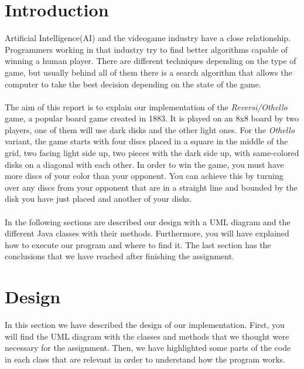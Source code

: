 \documentclass[12pt]{article}
\begin{document}
\section{Introduction}
Artificial Intelligence(AI) and the videogame industry have a close relationship. Programmers working in that industry try to find better algorithms capable of winning a human player. There are different techniques depending on the type of game, but usually behind all of them there is a search algorithm that allows the computer to take the best decision depending on the state of the game.\\
\\ 
The aim of this report is to explain our implementation of the \emph{Reversi/Othello} game, a popular board game created in 1883. It is played on an 8x8 board by two players, one of them will use dark disks and the other light ones. For the \emph{Othello} variant, the game starts with four discs placed in a square in the middle of the grid,  two facing light side up, two pieces with the dark side up, with same-colored disks on a diagonal with each other. In order to win the game, you must have more discs of your color than your opponent. You can achieve this by turning over any discs from your opponent that are in a straight line and bounded by the disk you have just placed and another of your disks.\\
\\
In the following sections are described our design with a UML diagram and the different Java classes with their methods. Furthermore, you will have explained how to execute our program and where to find it.  The last section has the conclusions that we have reached after finishing the assignment. 
\section{Design}
In this section we have described the design of our implementation. First, you will find the UML diagram with the classes and methods that we thought were necessary for the assignment. Then, we have highlighted some parts of the code in each class that are relevant in order to understand how the program works.
\newpage  
\end{document}
